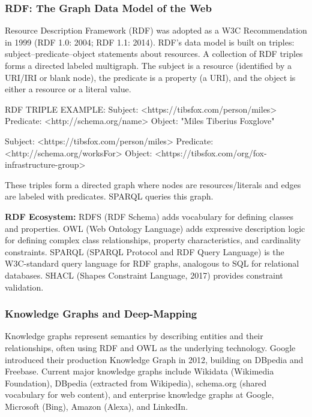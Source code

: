 \documentclass[11pt,letterpaper]{article}
\begin{document}
\subsubsection{RDF: The Graph Data Model of the Web}

Resource Description Framework (RDF) was adopted as a W3C Recommendation in 1999 (RDF 1.0: 2004; RDF 1.1: 2014). RDF's data model is built on triples: subject--predicate--object statements about resources. A collection of RDF triples forms a directed labeled multigraph. The subject is a resource (identified by a URI/IRI or blank node), the predicate is a property (a URI), and the object is either a resource or a literal value.

\begin{asciibox}
RDF TRIPLE EXAMPLE:
  Subject:    <https://tibsfox.com/person/miles>
  Predicate:  <http://schema.org/name>
  Object:     "Miles Tiberius Foxglove"

  Subject:    <https://tibsfox.com/person/miles>
  Predicate:  <http://schema.org/worksFor>
  Object:     <https://tibsfox.com/org/fox-infrastructure-group>

These triples form a directed graph where nodes are resources/literals
and edges are labeled with predicates. SPARQL queries this graph.
\end{asciibox}

\textbf{RDF Ecosystem:} RDFS (RDF Schema) adds vocabulary for defining classes and properties. OWL (Web Ontology Language) adds expressive description logic for defining complex class relationships, property characteristics, and cardinality constraints. SPARQL (SPARQL Protocol and RDF Query Language) is the W3C-standard query language for RDF graphs, analogous to SQL for relational databases. SHACL (Shapes Constraint Language, 2017) provides constraint validation.

\subsubsection{Knowledge Graphs and Deep-Mapping}

Knowledge graphs represent semantics by describing entities and their relationships, often using RDF and OWL as the underlying technology. Google introduced their production Knowledge Graph in 2012, building on DBpedia and Freebase. Current major knowledge graphs include Wikidata (Wikimedia Foundation), DBpedia (extracted from Wikipedia), schema.org (shared vocabulary for web content), and enterprise knowledge graphs at Google, Microsoft (Bing), Amazon (Alexa), and LinkedIn.
\end{document}
